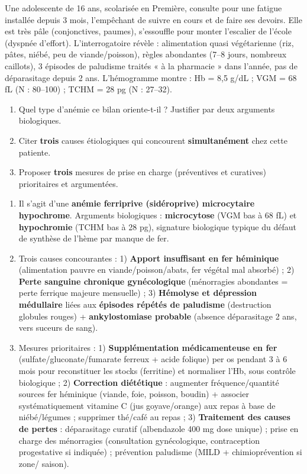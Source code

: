 \documentclass[11pt]{article}
\begin{document}
\begin{exercice}
Une adolescente de 16 ans, scolarisée en Première, consulte pour une fatigue installée depuis 3 mois, l'empêchant de suivre en cours et de faire ses devoirs. Elle est très pâle (conjonctives, paumes), s'essouffle pour monter l'escalier de l'école (dyspnée d'effort). L'interrogatoire révèle : alimentation quasi végétarienne (riz, pâtes, niébé, peu de viande/poisson), règles abondantes (7--8 jours, nombreux caillots), 3 épisodes de paludisme traités « à la pharmacie » dans l'année, pas de déparasitage depuis 2 ans. L'hémogramme montre : Hb = 8,5 g/dL ; VGM = 68 fL (N : 80--100) ; TCHM = 28 pg (N : 27--32).
\begin{enumerate}
\item Quel type d'anémie ce bilan oriente-t-il ? Justifier par deux arguments biologiques.
\item Citer \textbf{trois} causes étiologiques qui concourent \textbf{simultanément} chez cette patiente.
\item Proposer \textbf{trois} mesures de prise en charge (préventives et curatives) prioritaires et argumentées.
\end{enumerate}
\end{exercice}

\begin{corrige}
\begin{enumerate}
\item Il s'agit d'une \textbf{anémie ferriprive (sidéroprive) microcytaire hypochrome}. Arguments biologiques : \textbf{microcytose} (VGM bas à 68 fL) et \textbf{hypochromie} (TCHM bas à 28 pg), signature biologique typique du défaut de synthèse de l'hème par manque de fer.
\item Trois causes concourantes : 1) \textbf{Apport insuffisant en fer héminique} (alimentation pauvre en viande/poisson/abats, fer végétal mal absorbé) ; 2) \textbf{Perte sanguine chronique gynécologique} (ménorragies abondantes = perte ferrique majeure mensuelle) ; 3) \textbf{Hémolyse et dépression médullaire} liées aux \textbf{épisodes répétés de paludisme} (destruction globules rouges) + \textbf{ankylostomiase probable} (absence déparasitage 2 ans, vers suceurs de sang).
\item Mesures prioritaires : 1) \textbf{Supplémentation médicamenteuse en fer} (sulfate/gluconate/fumarate ferreux + acide folique) per os pendant 3 à 6 mois pour reconstituer les stocks (ferritine) et normaliser l'Hb, sous contrôle biologique ; 2) \textbf{Correction diététique} : augmenter fréquence/quantité sources fer héminique (viande, foie, poisson, boudin) + associer systématiquement vitamine C (jus goyave/orange) aux repas à base de niébé/légumes ; supprimer thé/café au repas ; 3) \textbf{Traitement des causes de pertes} : déparasitage curatif (albendazole 400 mg dose unique) ; prise en charge des ménorragies (consultation gynécologique, contraception progestative si indiquée) ; prévention paludisme (MILD + chimioprévention si zone/ saison).
\end{enumerate}
\end{corrige}
\end{document}
